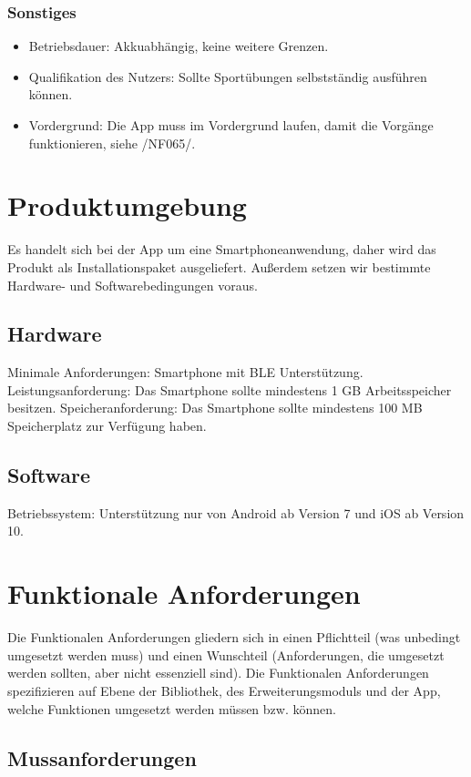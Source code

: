 \documentclass[a4paper,12pt]{article}
\begin{document}
    \subsubsection{Sonstiges}
    \begin{itemize}
      \item \textsf{Betriebsdauer:} \glqq Akkuabhängig\grqq, keine weitere Grenzen.
      \item \textsf{Qualifikation des Nutzers:} Sollte Sportübungen selbstständig ausführen können.
      \item \textsf{Vordergrund:} Die App muss im Vordergrund laufen, damit die Vorgänge funktionieren, siehe /NF065/.
    \end{itemize}
\clearpage
\section{Produktumgebung}
Es handelt sich bei der App um eine Smartphoneanwendung, daher wird das Produkt als Installationspaket ausgeliefert. Außerdem setzen wir bestimmte Hardware- und Softwarebedingungen voraus.
\subsection{Hardware} 
	\textsf{Minimale Anforderungen:} Smartphone mit \Gls{BLE} Unterstützung. %
	\textsf{Leistungsanforderung:} Das Smartphone sollte mindestens 1 GB Arbeitsspeicher besitzen.
	\textsf{Speicheranforderung:} Das Smartphone sollte mindestens 100 MB Speicherplatz zur Verfügung haben.
\subsection{Software} 
	\textsf{Betriebssystem:} Unterstützung nur von Android ab Version 7 und iOS ab Version 10.
\newline
\newline
\newline
\section{Funktionale Anforderungen}
Die Funktionalen Anforderungen gliedern sich in einen Pflichtteil (was unbedingt umgesetzt werden muss) und einen Wunschteil (Anforderungen, die umgesetzt werden sollten, aber nicht essenziell sind). Die Funktionalen Anforderungen spezifizieren auf Ebene der Bibliothek, des Erweiterungsmoduls und der App, welche Funktionen umgesetzt werden müssen bzw. können. 
  \subsection{Mussanforderungen}
\end{document}
